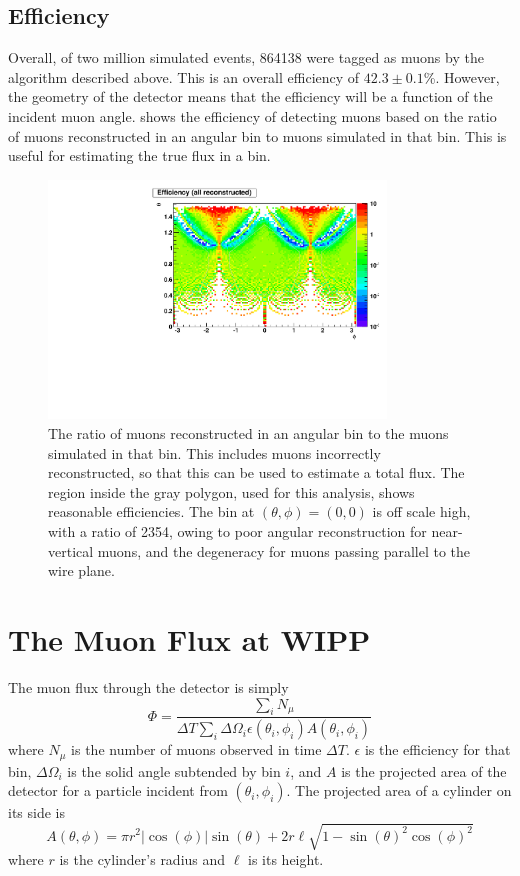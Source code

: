 \documentclass[herrin-thesis.tex]{subfiles}
\begin{document}
\subsection{Efficiency}
Overall, of two million simulated events, 864138 were tagged as muons by the algorithm described above. This is an overall efficiency of \(42.3 \pm 0.1\)\%. However, the geometry of the detector means that the efficiency will be a function of the incident muon angle.  shows the efficiency of detecting muons based on the ratio of muons reconstructed in an angular bin to muons simulated in that bin. This is useful for estimating the true flux in a bin.

 \begin{figure}[htb]
 \centering
 \includegraphics[width=0.8\textwidth]{./plots/muon_efficiency.pdf}
 \caption[Efficiency of reconstructing muons as a function of angle]{The ratio of muons reconstructed in an angular bin to the muons simulated in that bin. This includes muons incorrectly reconstructed, so that this can be used to estimate a total flux. The region inside the gray polygon, used for this analysis, shows reasonable efficiencies. The bin at \((\theta, \phi) = (0, 0)\) is off scale high, with a ratio of 2354, owing to poor angular reconstruction for near-vertical muons, and the degeneracy for muons passing parallel to the wire plane.}
 \label{fig:muon_efficiency}
 \end{figure}
 
\section{The Muon Flux at WIPP}
\label{sec:muon:wipp}
The muon flux through the detector is simply
\begin{equation}
\label{eq:muon_fluxdef}
\Phi = \frac{\sum_{i}N_{\mu}}{ \Delta T\sum_{i}\Delta\Omega_i \epsilon(\theta_i, \phi_i) A(\theta_i, \phi_i)}
\end{equation}
where \(N_\mu\) is the number of muons observed in time \(\Delta T\). \(\epsilon\) is the efficiency for that bin, \(\Delta\Omega_i\) is the solid angle subtended by bin \(i\), and \(A\) is the projected area of the detector for a particle incident from \((\theta_i, \phi_i)\). The projected area of a cylinder on its side is
\begin{equation}
A(\theta,\phi) = \pi r^2 |\cos(\phi)|\sin(\theta) + 2 r \ell \sqrt{1-\sin(\theta)^2 \cos(\phi)^2}
\end{equation}
where \(r\) is the cylinder's radius and \(\ell\) is its height.
\end{document}
